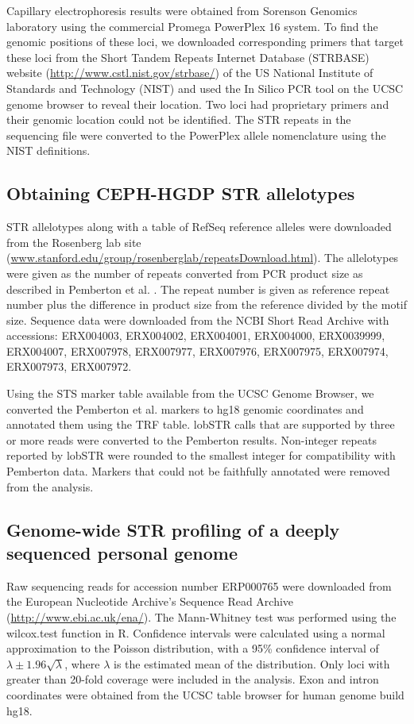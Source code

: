Capillary electrophoresis results were obtained from Sorenson Genomics laboratory using the commercial Promega PowerPlex 16 system. To find the genomic positions of these loci, we downloaded corresponding primers that target these loci from the Short Tandem Repeats Internet Database (STRBASE) website (\url{http://www.cstl.nist.gov/strbase/}) of the US National Institute of Standards and Technology (NIST) and used the In Silico PCR tool on the UCSC genome browser to reveal their location. Two loci had proprietary primers and their genomic location could not be identified. The STR repeats in the sequencing file were converted to the PowerPlex allele nomenclature using the NIST definitions.

\subsection{Obtaining CEPH-HGDP STR allelotypes}
STR allelotypes along with a table of RefSeq reference alleles were downloaded from the Rosenberg lab site (\url{www.stanford.edu/group/rosenberglab/repeatsDownload.html}). The allelotypes were given as the number of repeats converted from PCR product size as described in Pemberton et al. \cite{PembertonSandefurJakobssonEtAl2009}. The repeat number is given as reference repeat number plus the difference in product size from the reference divided by the motif size. Sequence data were downloaded from the NCBI Short Read Archive with accessions: ERX004003, ERX004002, ERX004001, ERX004000, ERX0039999, ERX004007, ERX007978, ERX007977, ERX007976, ERX007975, ERX007974, ERX007973, ERX007972.

Using the STS marker table available from the UCSC Genome Browser, we converted the Pemberton et al. markers to hg18 genomic coordinates and annotated them using the TRF table. lobSTR calls that are supported by three or more reads were converted to the Pemberton results. Non-integer repeats reported by lobSTR were rounded to the smallest integer for compatibility with Pemberton data. Markers that could not be faithfully annotated were removed from the analysis.

\subsection{Genome-wide STR profiling of a deeply sequenced personal genome}
Raw sequencing reads for accession number ERP000765 were downloaded from the European Nucleotide Archive's Sequence Read Archive (\url{http://www.ebi.ac.uk/ena/}). The Mann-Whitney test was performed using the wilcox.test function in R. Confidence intervals were calculated using a normal approximation to the Poisson distribution, with a 95\% confidence interval of $\lambda\pm 1.96\sqrt{\lambda}$, where $\lambda$ is the estimated mean of the distribution. Only loci with greater than 20-fold coverage were included in the analysis. Exon and intron coordinates were obtained from the UCSC table browser for human genome build hg18. 


